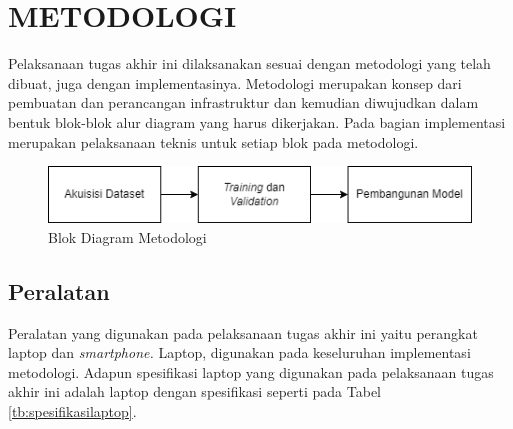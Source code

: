 
\chapter{METODOLOGI}
\label{chap:metodologi}


Pelaksanaan tugas akhir ini dilaksanakan sesuai dengan metodologi yang telah dibuat, juga dengan implementasinya. Metodologi merupakan konsep dari pembuatan dan perancangan infrastruktur dan kemudian diwujudkan dalam bentuk blok-blok alur diagram yang harus dikerjakan. Pada bagian implementasi merupakan pelaksanaan teknis untuk setiap blok pada metodologi.

\begin{figure}[H]
    \centering
    \includegraphics[scale=0.9]{gambar/metodologi_umum.png}
    \caption{Blok Diagram Metodologi}
    \label{fig:desainsistem}
\end{figure}

\section{Peralatan}
\label{sec:peralatan}
Peralatan yang digunakan pada pelaksanaan tugas akhir ini yaitu perangkat laptop dan \textit{smartphone.} Laptop, digunakan pada keseluruhan implementasi metodologi. Adapun spesifikasi laptop yang digunakan pada pelaksanaan tugas akhir ini adalah laptop dengan spesifikasi seperti pada Tabel \ref{tb:spesifikasilaptop}.\par

